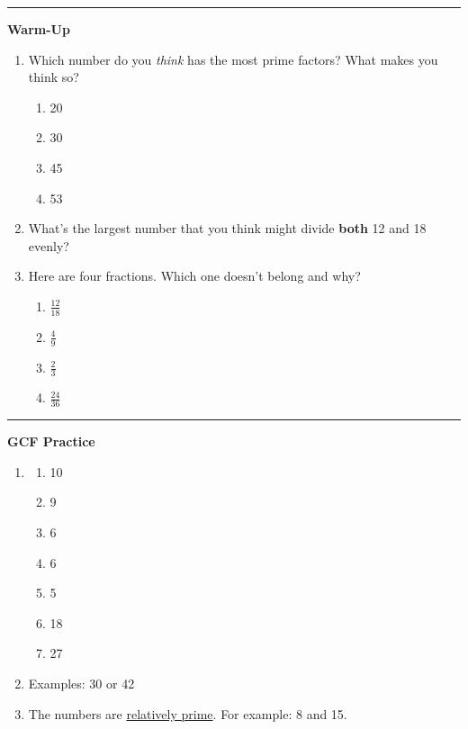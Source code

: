 \documentclass[
  letterpaper,
  DIV=11,
  numbers=noendperiod]{scrreprt}
\providecommand{\tightlist}{%
  \setlength{\itemsep}{0pt}\setlength{\parskip}{0pt}}
\begin{document}
\begin{center}\rule{0.5\linewidth}{0.5pt}\end{center}

\textbf{Warm-Up}

\begin{enumerate}
\def\labelenumi{\arabic{enumi}.}
\item
  Which number do you \emph{think} has the most prime factors? What
  makes you think so?

  \begin{enumerate}
  \def\labelenumii{\alph{enumii}.}
  \item
    20
  \item
    30
  \item
    45
  \item
    53
  \end{enumerate}
\item
  What's the largest number that you think might divide \textbf{both} 12
  and 18 evenly?
\item
  Here are four fractions. Which one doesn't belong and why?

  \begin{enumerate}
  \def\labelenumii{\alph{enumii}.}
  \item
    \(\frac{12}{18}\)
  \item
    \(\frac{4}{9}\)
  \item
    \(\frac{2}{3}\)
  \item
    \(\frac{24}{36}\)
  \end{enumerate}
\end{enumerate}

\begin{center}\rule{0.5\linewidth}{0.5pt}\end{center}

\textbf{GCF Practice}

\begin{enumerate}
\def\labelenumi{\arabic{enumi}.}
\item
  \begin{enumerate}
  \def\labelenumii{\alph{enumii}.}
  \tightlist
  \item
    10
  \item
    9
  \item
    6
  \item
    6
  \item
    5
  \item
    18
  \item
    27
  \end{enumerate}
\item
  Examples: 30 or 42
\item
  The numbers are
  \href{./glossary.html\#glossary-relatively-prime}{relatively prime}.
  For example: 8 and 15.
\end{enumerate}
\end{document}
